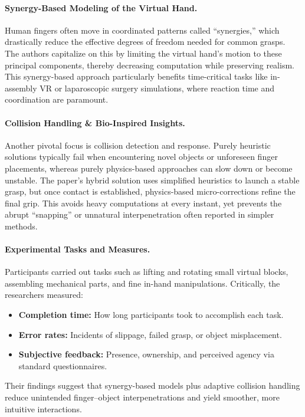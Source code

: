 \documentclass{llncs}
\begin{document}
\paragraph{Synergy-Based Modeling of the Virtual Hand.}
Human fingers often move in coordinated patterns called ``synergies,'' which drastically reduce the effective degrees of freedom needed for common grasps. The authors capitalize on this by limiting the virtual hand’s motion to these principal components, thereby decreasing computation while preserving realism. This synergy-based approach particularly benefits time-critical tasks like in-assembly VR or laparoscopic surgery simulations, where reaction time and coordination are paramount.

\paragraph{Collision Handling \& Bio-Inspired Insights.}
Another pivotal focus is collision detection and response. Purely heuristic solutions typically fail when encountering novel objects or unforeseen finger placements, whereas purely physics-based approaches can slow down or become unstable. The paper’s hybrid solution uses simplified heuristics to launch a stable grasp, but once contact is established, physics-based micro-corrections refine the final grip. This avoids heavy computations at every instant, yet prevents the abrupt ``snapping'' or unnatural interpenetration often reported in simpler methods.

\paragraph{Experimental Tasks and Measures.}
Participants carried out tasks such as lifting and rotating small virtual blocks, assembling mechanical parts, and fine in-hand manipulations. Critically, the researchers measured:
\begin{itemize}
    \item \textbf{Completion time:} How long participants took to accomplish each task.
    \item \textbf{Error rates:} Incidents of slippage, failed grasp, or object misplacement.
    \item \textbf{Subjective feedback:} Presence, ownership, and perceived agency via standard questionnaires.
\end{itemize}
Their findings suggest that synergy-based models plus adaptive collision handling reduce unintended finger--object interpenetrations and yield smoother, more intuitive interactions.
\end{document}
